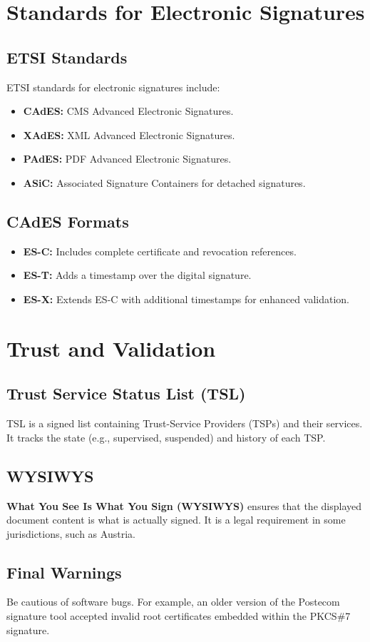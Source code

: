 \chapter{Standards for Electronic Signatures}

\section{ETSI Standards}
ETSI standards for electronic signatures include:
\begin{itemize}
    \item \textbf{CAdES:} CMS Advanced Electronic Signatures.
    \item \textbf{XAdES:} XML Advanced Electronic Signatures.
    \item \textbf{PAdES:} PDF Advanced Electronic Signatures.
    \item \textbf{ASiC:} Associated Signature Containers for detached signatures.
\end{itemize}

\section{CAdES Formats}
\begin{itemize}
    \item \textbf{ES-C:} Includes complete certificate and revocation references.
    \item \textbf{ES-T:} Adds a timestamp over the digital signature.
    \item \textbf{ES-X:} Extends ES-C with additional timestamps for enhanced validation.
\end{itemize}

\chapter{Trust and Validation}

\section{Trust Service Status List (TSL)}
TSL is a signed list containing Trust-Service Providers (TSPs) and their services. It tracks the state (e.g., supervised, suspended) and history of each TSP.

\section{WYSIWYS}
\textbf{What You See Is What You Sign (WYSIWYS)} ensures that the displayed document content is what is actually signed. It is a legal requirement in some jurisdictions, such as Austria.

\section{Final Warnings}
Be cautious of software bugs. For example, an older version of the Postecom signature tool accepted invalid root certificates embedded within the PKCS\#7 signature.


